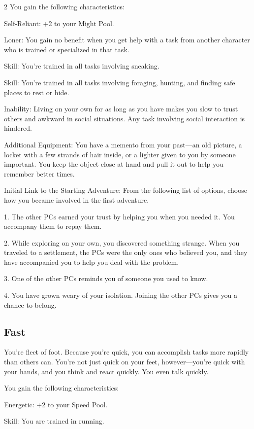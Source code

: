 \begin{multicols}{2}
You gain the following characteristics:

Self-Reliant: +2 to your Might Pool.

Loner: You gain no benefit when you get help with a task from another character who is trained or specialized in that task.

Skill: You’re trained in all tasks involving sneaking.

Skill: You’re trained in all tasks involving foraging, hunting, and finding safe places to rest or hide.

Inability: Living on your own for as long as you have makes you slow to trust others and awkward in social situations. Any task involving social interaction is hindered.

Additional Equipment: You have a memento from your past—an old picture, a locket with a few strands of hair inside, or a lighter given to you by someone important. You keep the object close at hand and pull it out to help you remember better times.

Initial Link to the Starting Adventure: From the following list of options, choose how you became involved in the first adventure.

1. The other PCs earned your trust by helping you when you needed it. You accompany them to repay them.

2. While exploring on your own, you discovered something strange. When you traveled to a settlement, the PCs were the only ones who believed you, and they have 
accompanied you to help you deal with the problem.

3. One of the other PCs reminds you of someone you used to know.

4. You have grown weary of your isolation. Joining the other PCs gives you a chance to belong.

\subsection{Fast}

You’re fleet of foot. Because you’re quick, you can accomplish tasks more rapidly than others can. You’re not just quick on your feet, however—you’re quick with your hands, and you think and react quickly. You even talk quickly.

You gain the following characteristics:

Energetic: +2 to your Speed Pool.

Skill: You are trained in running.


\end{multicols}
